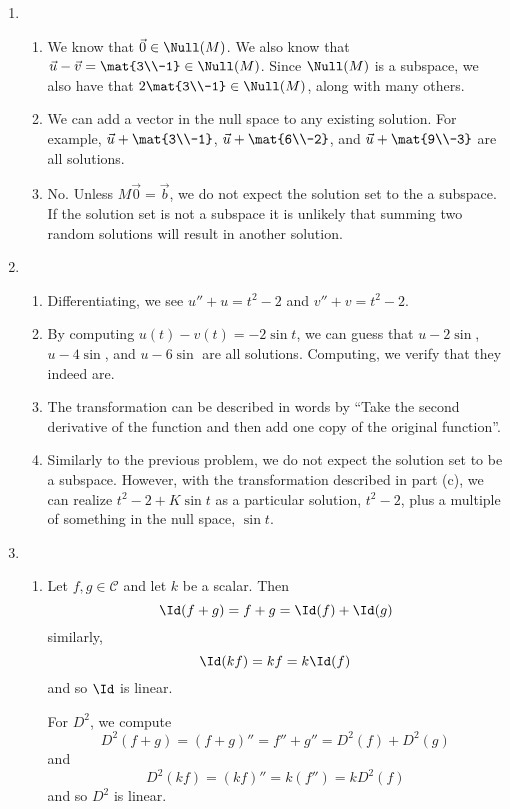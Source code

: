 \begin{enumerate}
		\item \begin{enumerate}
			\item We know that $\vec 0\in \Null(M)$. We also know that $\vec u-\vec v=\mat{3\\-1}\in \Null(M)$. Since $\Null(M)$
			is a subspace, we also have that $2\mat{3\\-1}\in\Null(M)$, along with many others.
			\item We can add a vector in the null space to any existing solution. For example, $\vec u+\mat{3\\-1}$, $\vec u+\mat{6\\-2}$, 
			and $\vec u+\mat{9\\-3}$ are all solutions.
			\item No. Unless $M\vec 0=\vec b$, we do not expect the solution set to the a subspace. If the solution set is not a subspace
			it is unlikely that summing two random solutions will result in another solution.
		\end{enumerate}
		
		\item \begin{enumerate}
			\item Differentiating, we see $u''+u=t^2-2$ and $v''+v=t^2-2$.
			\item By computing $u(t)-v(t)=-2\sin t$, we can guess that $u-2\sin$, $u-4\sin$, and $u-6\sin$ are all solutions. Computing,
			we verify that they indeed are.
			\item The transformation can be described in words by ``Take the second derivative of the function and then add one copy of the original function''.
			\item Similarly to the previous problem, we do not expect the solution set to be a subspace. However, with the transformation described in
			part (c), we can realize $t^2-2+K\sin t$ as a particular solution, $t^2-2$, plus a multiple of something in the null space, $\sin t$.
		\end{enumerate}
		
		\item \begin{enumerate}
			\item Let $f,g\in \mathcal C$ and let $k$ be a scalar. Then 
			\[\Id(f+g)=f+g=\Id(f)+\Id(g)\]
			similarly,
			\[
				\Id(kf)=kf=k\Id(f)
			\]
				and so $\Id$ is linear.

			For $D^2$, we compute
			\[
				D^2(f+g)=(f+g)''=f''+g''=D^2(f)+D^2(g)
			\]
			 and 
			 \[
			 	D^2(kf)=(kf)''=k(f'')=kD^2(f)
			 \]
				and so $D^2$ is linear.


\end{enumerate}
\end{enumerate}
